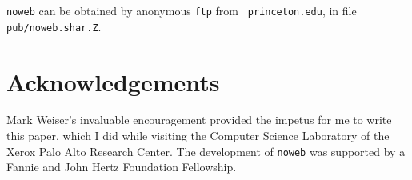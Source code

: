 % 

\verb+noweb+ can be obtained by 
anonymous {\tt ftp} from  {\tt
princeton.edu}, in file {\tt pub/noweb.shar.Z}.

\section{Acknowledgements}
Mark Weiser's invaluable encouragement provided the impetus for me to
write this paper, which I did while visiting the Computer
Science Laboratory of the Xerox Palo Alto Research Center.
The development of {\tt noweb} was supported by a Fannie and John Hertz
Foundation Fellowship.





